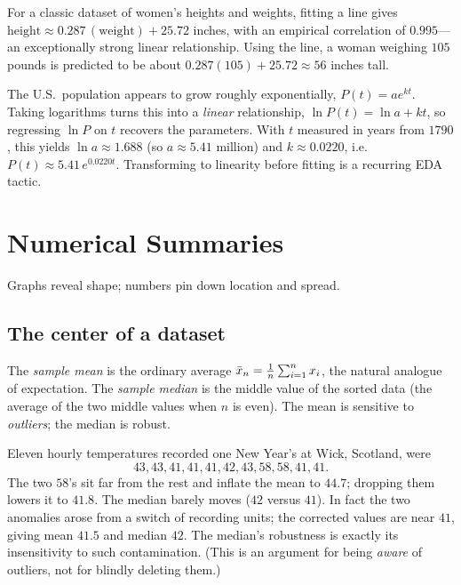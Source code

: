 \begin{example}
For a classic dataset of women's heights and weights, fitting a line gives
$\text{height}\approx 0.287\,(\text{weight})+25.72$ inches, with an empirical
correlation of $0.995$—an exceptionally strong linear relationship. Using the
line, a woman weighing $105$ pounds is predicted to be about
$0.287(105)+25.72\approx 56$ inches tall.
\end{example}

\begin{example}
The U.S.\ population appears to grow roughly exponentially, $P(t)=ae^{kt}$.
Taking logarithms turns this into a \emph{linear} relationship,
$\ln P(t)=\ln a + kt$, so regressing $\ln P$ on $t$ recovers the parameters. With
$t$ measured in years from $1790$, this yields $\ln a\approx 1.688$ (so
$a\approx 5.41$ million) and $k\approx 0.0220$, i.e.\ $P(t)\approx 5.41\,e^{0.0220t}$.
Transforming to linearity before fitting is a recurring EDA tactic.
\end{example}

\section{Numerical Summaries}

Graphs reveal shape; numbers pin down location and spread.

\subsection{The center of a dataset}

The \emph{sample mean} is the ordinary average
$\bar{x}_n=\tfrac1n\sum_{i=1}^n x_i$, the natural analogue of expectation. The
\emph{sample median} is the middle value of the sorted data (the average of the
two middle values when $n$ is even). The mean is sensitive to \emph{outliers};
the median is robust.

\begin{example}
Eleven hourly temperatures recorded one New Year's at Wick, Scotland, were
\[
  43,43,41,41,41,42,43,58,58,41,41.
\]
The two $58$'s sit far from the rest and inflate the mean to $44.7$; dropping
them lowers it to $41.8$. The median barely moves ($42$ versus $41$). In fact the
two anomalies arose from a switch of recording units; the corrected values are
near $41$, giving mean $41.5$ and median $42$. The median's robustness is exactly
its insensitivity to such contamination. (This is an argument for being
\emph{aware} of outliers, not for blindly deleting them.)
\end{example}

